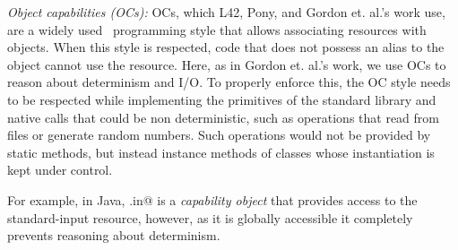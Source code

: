 
\textit{Object capabilities (OCs):}
OCs, which L42, Pony, and Gordon et. al.'s work use, are a widely used~\cite{miller2003capability,
noble2016abstract,karger1988improving} programming style that allows associating resources with objects. When this style
is respected, code that does not possess an alias to the object cannot use the resource.
Here, as in Gordon et. al.'s work, we use OCs to reason about determinism and I/O. To properly enforce this, the OC style needs to be respected while implementing the primitives of the standard library and native calls that could be non deterministic, such as operations that read from files or generate random numbers. Such operations would not be provided by static methods, but instead instance methods of classes whose instantiation is kept under control. 




\lstset{language=Java}
 For example, in Java, \Q@System.in@
 \lstset{language=FortyTwo} 
  is a \emph{capability object} that provides access to the standard-input resource, however, as it is globally accessible it completely prevents reasoning about determinism. 

